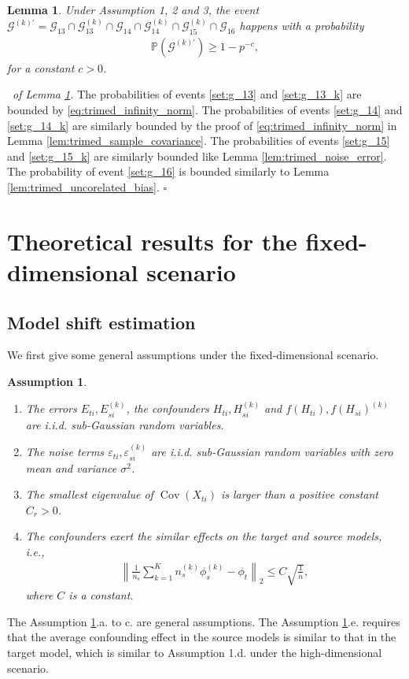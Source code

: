 \documentclass[12pt]{article}
\newtheorem{lemma}{Lemma}
\newtheorem{assump}{Assumption}
\newenvironment{pf}{{\noindent \it Proof}\ }{\hfill $\square$\par}
\begin{document}
\begin{lemma}
    \label{lem:high_probability_set4}
    Under Assumption 1, 2 and 3, the event $\mathcal{G}^{(k)'} = \mathcal{G}_{13}\cap\mathcal{G}_{13}^{(k)}\cap \mathcal{G}_{14}\cap\mathcal{G}_{14}^{(k)}\cap \mathcal{G}_{15}^{(k)}\cap \mathcal{G}_{16}$ happens with a probability 
    \begin{align*}
        \mathbb{P}(\mathcal{G}^{(k)'}) \ge 1- p^{-c},
    \end{align*}
    for a constant $c>0$.
\end{lemma}
\begin{pf}{\it of Lemma \ref{lem:high_probability_set4}. }
    The probabilities of events \ref{set:g_13} and \ref{set:g_13_k} are bounded by \eqref{eq:trimed_infinity_norm}. The probabilities of events \ref{set:g_14} and \ref{set:g_14_k} are similarly bounded by the proof of \eqref{eq:trimed_infinity_norm} in Lemma \ref{lem:trimed_sample_covariance}.  The probabilities of events \ref{set:g_15} and \ref{set:g_15_k} are similarly bounded like Lemma \ref{lem:trimed_noise_error}. The probability of event \ref{set:g_16} is bounded similarly to Lemma \ref{lem:trimed_uncorelated_bias}. 
\end{pf}

\section{Theoretical results for the fixed-dimensional scenario}
\subsection{Model shift estimation}
We first give some general assumptions under the fixed-dimensional scenario. 
\begin{assump}
\label{assum:sup:general_assump}
    \begin{enumerate}
    \item[a.] The errors $E_{ti},E_{si}^{(k)}$, the confounders $H_{ti},H_{si}^{(k)}$ and $f(H_{ti}),f(H_{si})^{(k)}$ are i.i.d. sub-Gaussian random variables. 
        \item[b.] The noise terms $\varepsilon_{ti}, \varepsilon_{si}^{(k)}$ are i.i.d. sub-Gaussian random variables with zero mean and variance $\sigma^2$. 
        \item[c.] The smallest eigenvalue of $\operatorname{Cov}(X_{ti})$ is larger than a positive constant $C_r>0$.
        \item[d.] The confounders exert the similar effects on the target and source models, i.e., 
        \begin{align*}
            \left\|\frac{1}{n_s}\sum_{k=1}^K n_s^{(k)}\phi_s^{(k)} - \phi_t\right\|_2 \le C\sqrt{\frac{1}{n}},
        \end{align*}
        where $C$ is a constant. 
    \end{enumerate}
\end{assump}
The Assumption \ref{assum:sup:general_assump}.a. to c. are general assumptions. The Assumption \ref{assum:sup:general_assump}.e. requires that the average confounding effect in the source models is similar to that in the target model, which is similar to Assumption 1.d. under the high-dimensional scenario. 
\end{document}
